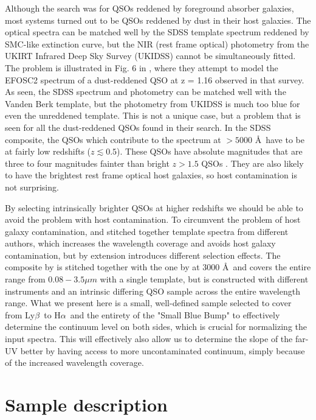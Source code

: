 \documentclass{aa}    %
\newcommand{\sectlabel}[1]{\label{sect:#1}}
\newcommand{\lyb}{Ly$\beta$}
\newcommand{\ha}{H$\alpha$}
\begin{document}
Although the search was for QSOs reddened by foreground absorber
galaxies, most systems turned out to be QSOs reddened by dust in their
host galaxies. The optical spectra can be matched well by the SDSS
template spectrum reddened by SMC-like extinction curve, but the NIR
(rest frame optical) photometry from the UKIRT Infrared Deep Sky Survey (UKIDSS) cannot be simultaneously
fitted. The problem is illustrated in Fig. 6 in \citet{Fynbo2013},
where they attempt to model the EFOSC2 spectrum of a dust-reddened QSO
at z = 1.16 observed in that survey. As seen, the SDSS spectrum and
photometry can be matched well with the Vanden Berk template, but the
photometry from UKIDSS is much too blue for even the unreddened
template. This is not a unique case, but a problem that is seen for
all the dust-reddened QSOs found in their search.  In the SDSS
composite, the QSOs which contribute to the spectrum at $ > 5000$
\AA~have to be at fairly low redshifts ($z \lesssim 0.5$). These QSOs
have absolute magnitudes that are three to four magnitudes fainter than bright
$z > 1.5$ QSOs \citep[e.g.,][their Fig.~1]{VandenBerk2001}. They are
also likely to have the brightest rest frame optical host galaxies, so host contamination is not surprising. 

By selecting intrinsically
brighter QSOs at higher redshifts we should be able to avoid the
problem with host contamination.  To circumvent the problem
of host galaxy contamination, \citet{Fynbo2013} and
\citet{Krogager2015} stitched together template spectra from different
authors, which increases the wavelength coverage and avoids host galaxy
contamination, but by extension introduces different selection
effects. The composite by \citet{Glikman2006} is stitched together
with the one by \citet{VandenBerk2001} at $3000$ \AA~and covers the
entire range from $0.08 - 3.5 \mu m$ with a single template, but is
constructed with different instruments and an intrinsic differing QSO
sample across the entire wavelength range.  What we present here is a
small, well-defined sample selected to cover from \lyb~to \ha~and the
entirety of the "Small Blue Bump" to effectively determine the
continuum level on both sides, which is crucial for normalizing
the input spectra. This will effectively also allow us to determine
the slope of the far-UV better by having access to more uncontaminated
continuum, simply because of the increased wavelength coverage.


\section{Sample description}   \sectlabel{sample}
\end{document}
